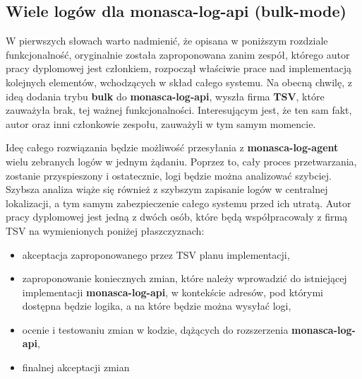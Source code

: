 \subsection{Wiele logów dla monasca-log-api (bulk-mode)}
\label{chapter:application_own:plans:bulk_monasca_log_api}

W pierwszych słowach warto nadmienić, że opisana w poniższym rozdziale funkcjonalność, oryginalnie została 
zaproponowana zanim zespół, którego autor pracy dyplomowej jest członkiem, rozpoczął właściwie prace
nad implementacją kolejnych elementów, wchodzących w skład całego systemu. Na obecną chwilę, z ideą 
dodania trybu \textbf{bulk} do \textbf{monasca-log-api}, wyszła firma \textbf{TSV}, które zauważyła brak, tej
ważnej funkcjonalności. Interesującym jest, że ten sam fakt, autor oraz inni członkowie zespołu, zauważyli
w tym samym momencie. 

Ideę całego rozwiązania będzie możliwość przesyłania z \textbf{monasca-log-agent} wielu zebranych logów
w jednym żądaniu. Poprzez to, cały proces przetwarzania, zostanie przyspieszony i ostatecznie, logi
będzie można analizować szybciej. Szybsza analiza wiąże się również z szybszym zapisanie logów w centralnej lokalizacji,
a tym samym zabezpieczenie całego systemu przed ich utratą. Autor pracy dyplomowej jest jedną z dwóch osób, które będą
współpracowały z firmą TSV na wymienionych poniżej płaszczyznach:
\begin{itemize}
    \item akceptacja zaproponowanego przez TSV planu implementacji,
    \item zaproponowanie koniecznych zmian, które należy wprowadzić do istniejącej implementacji \textbf{monasca-log-api},
    w kontekście adresów, pod którymi dostępna będzie logika, a na które będzie można wysyłać logi,
    \item ocenie i testowaniu zmian w kodzie, dążących do rozszerzenia \textbf{monasca-log-api},
    \item finalnej akceptacji zmian
\end{itemize}